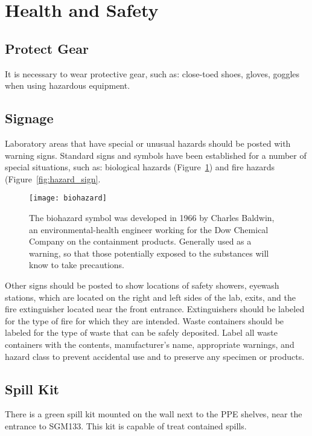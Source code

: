 \documentclass[12pt]{../SOP4_alpha}\usepackage[]{graphicx}\usepackage[]{color}
\begin{document}
\section{Health and Safety}

\subsection{Protect Gear}

\NP It is necessary to wear protective gear, such as: close-toed shoes, gloves, goggles when using hazardous equipment.

\subsection{Signage}

\NP Laboratory areas that have special or unusual hazards should be posted with warning signs. Standard signs and symbols have been established for a number of special situations, such as: biological hazards (Figure~\ref{fig:biohzard}) and fire hazards (Figure~\ref{fig:hazard_sign}.


\begin{figure}
  \centering
  \texttt{[image: biohazard]}
  \caption{The biohazard symbol was developed in 1966 by Charles Baldwin, an environmental-health engineer working for the Dow Chemical Company on the containment products. Generally used as a warning, so that those potentially exposed to the substances will know to take precautions.}
  \label{fig:biohzard}
\end{figure}

\NP Other signs should be posted to show locations of safety showers, eyewash stations, which are located on the right and left sides of the lab, exits, and the fire extinguisher located near the front entrance. Extinguishers should be labeled for the type of fire for which they are intended. Waste containers should be labeled for the type of waste that can be safely deposited. Label all waste containers with the contents, manufacturer's name, appropriate warnings, and hazard class to prevent accidental use and to preserve any specimen or products. 

\subsection{Spill Kit} 

\NP There is a green spill kit mounted on the wall next to the PPE shelves, near the entrance to SGM133. This kit is capable of treat contained spills.
\end{document}
